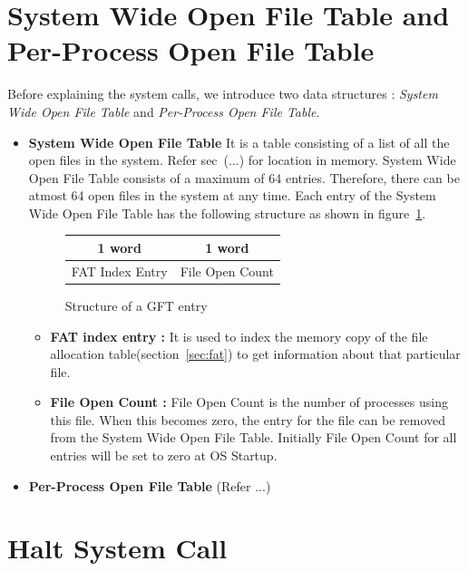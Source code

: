 \documentclass[10pt]{report}
\newcounter{syscall}
\begin{document}
\section{System Wide Open File Table and  Per-Process Open File Table}
Before explaining the system calls, we introduce two data structures : \textit{System Wide Open File Table} and \textit{Per-Process Open File Table}.
\begin{itemize}
	\item \textbf{System Wide Open File Table} \label{lbl:gft} 
	 It is a table consisting of a list of all the open files in the system. Refer sec~(...) for location in memory. System Wide Open File Table consists of a maximum of 64 entries. Therefore, there can be atmost 64 open files in the system at any time. Each entry of the System Wide Open File Table has the following structure as shown in figure~\ref{fig:gft}.

	 \begin{figure}[h!]
		 \centering
			\begin{tabular}{|c|c|}
				1 word & 1 word	\\		
				\hline
				FAT Index Entry & File Open Count\\
				\hline
			\end{tabular}
		 \caption{Structure of a GFT entry}
		 \label{fig:gft}
	 \end{figure}

	 \begin{itemize}
		 \item \textbf{FAT index entry :}  It is used to index the memory copy of the file allocation table(section~\ref{sec:fat}) to get information about that particular file.

		 \item \textbf{File Open Count :} File Open Count is the number of processes using this ﬁle. When this becomes zero, the entry for the file can be removed from the System Wide Open File Table. Initially File Open Count for all entries will be set to zero at OS Startup.
	 \end{itemize}

	\item \textbf{Per-Process Open File Table} \label{lbl:lft}  (Refer ...)
	
\end{itemize}


\section{Halt System Call}
\label{haltsyscall}
\end{document}
